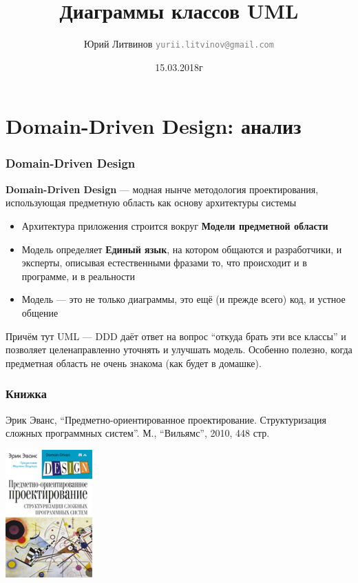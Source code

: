 \documentclass[xetex,mathserif,serif]{beamer}
\title{Диаграммы классов UML}
\author[Юрий Литвинов]{Юрий Литвинов \newline \textcolor{gray}{\small\texttt{yurii.litvinov@gmail.com}}}
\date{15.03.2018г}
\begin{document}
	
	\frame{\titlepage}

	\section{Domain-Driven Design: анализ}

	\begin{frame}
		\frametitle{Domain-Driven Design}
		\textbf{Domain-Driven Design} --- модная нынче методология проектирования, использующая предметную область как основу архитектуры системы
		\begin{itemize}
			\item Архитектура приложения строится вокруг \textbf{Модели предметной области}
			\item Модель определяет \textbf{Единый язык}, на котором общаются и разработчики, и эксперты, описывая естественными фразами то, что происходит и в программе, и в реальности
			\item Модель --- это не только диаграммы, это ещё (и прежде всего) код, и устное общение
		\end{itemize}
		Причём тут UML --- DDD даёт ответ на вопрос ``откуда брать эти все классы'' и позволяет целенаправленно уточнять и улучшать модель. 
		Особенно полезно, когда предметная область не очень знакома (как будет в домашке).
	\end{frame}

	\begin{frame}
		\frametitle{Книжка}
		Эрик Эванс, ``Предметно-ориентированное проектирование. Структуризация сложных программных систем''. М., ``Вильямс'', 2010, 448 стр.
		\begin{center}
			\includegraphics[width=0.25\textwidth]{dddCover.jpg}
		\end{center}
	\end{frame}
\end{document}

